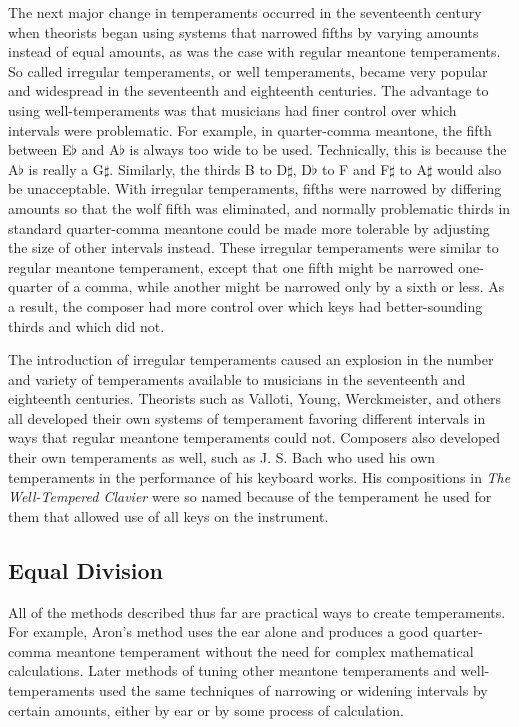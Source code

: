 The next major change in temperaments occurred in the seventeenth century when theorists began using systems that
narrowed fifths by varying amounts instead of equal amounts, as was the case with regular meantone temperaments. So
called irregular temperaments, or well temperaments, became very popular and widespread in the seventeenth and
eighteenth centuries. The advantage to using well-temperaments was that musicians had finer control over which
intervals were problematic. For example, in quarter-comma meantone, the fifth between E$\flat$ and A$\flat$ is always
too wide to be used. Technically, this is because the A$\flat$ is really a G$\sharp$. \autocite[35]{RD:1} Similarly,
the thirds B to D$\sharp$, D$\flat$ to F and F$\sharp$ to A$\sharp$ would also be unacceptable. With irregular
temperaments, fifths were narrowed by differing amounts so that the wolf fifth was eliminated, and normally problematic
thirds in standard quarter-comma meantone could be made more tolerable by adjusting the size of other intervals instead.
These irregular temperaments were similar to regular meantone temperament, except that one fifth might be narrowed 
one-quarter of a comma, while another might be narrowed only by a sixth or less. As a result, the composer had more 
control over which keys had better-sounding thirds and which did not.

The introduction of irregular temperaments caused an explosion in the number and variety of temperaments available to
musicians in the seventeenth and eighteenth centuries. Theorists such as Valloti, Young, Werckmeister, and others all
developed their own systems of temperament favoring different intervals in ways that regular meantone temperaments could
not. Composers also developed their own temperaments as well, such as J. S. Bach who used his own temperaments in the
performance of his keyboard works. His compositions in \textit{The Well-Tempered Clavier} were so named because of the
temperament he used for them that allowed use of all keys on the instrument.

\subsection{Equal Division}

All of the methods described thus far are practical ways to create temperaments. For example, Aron's method uses the ear
alone and produces a good quarter-comma meantone temperament without the need for complex mathematical calculations.
Later methods of tuning other meantone temperaments and well-temperaments used the same techniques of narrowing or
widening intervals by certain amounts, either by ear or by some process of calculation.


